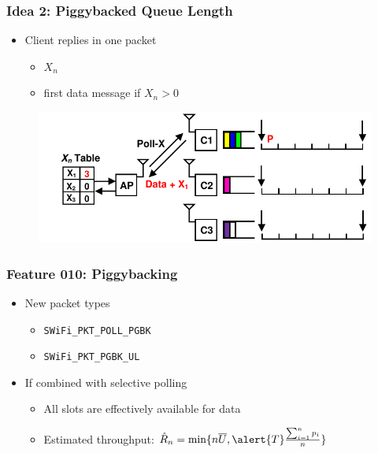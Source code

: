 \documentclass{beamer}
\begin{document}
\begin{frame}
\frametitle{Idea 2: Piggybacked Queue Length}
\begin{itemize}
\item Client replies in one packet
  \begin{itemize}
    \item $X_n$
    \item first data message if $X_n>0$
  \end{itemize}
\end{itemize}
\begin{figure}
\centering
\includegraphics[scale=0.8]{piggyback_1.pdf}
\end{figure}
\end{frame}

\begin{frame}
\frametitle{Feature 010: Piggybacking}
\begin{itemize}
  \item New packet types
    \begin{itemize}
      \item \lstinline|SWiFi_PKT_POLL_PGBK|
      \item \lstinline|SWiFi_PKT_PGBK_UL|
    \end{itemize}
  \item If combined with selective polling
    \begin{itemize}
      \item All slots are effectively available for data
      \item Estimated throughput: $\hat{R}_n = \min\{n\overline{U}, \alert{T}\frac{\sum_{i=1}^{n}p_i}{n} \}$
    \end{itemize}
\end{itemize}
\end{frame}
\end{document}
